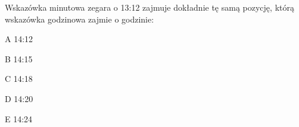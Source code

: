 \begin{tresc}
Wskazówka minutowa zegara o 13:12 zajmuje dokładnie tę samą pozycję, którą wskazówka godzinowa zajmie o godzinie:
\end{tresc}
\begin{wariant}{A} 14:12 \end{wariant}
\begin{wariant}{B} 14:15 \end{wariant}
\begin{wariant}{C} 14:18 \end{wariant}
\begin{wariant}{D} 14:20 \end{wariant}
\begin{wariant}{E} 14:24 \end{wariant}
